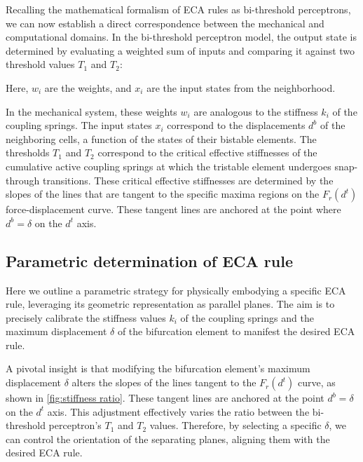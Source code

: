 Recalling the mathematical formalism of ECA rules as bi-threshold perceptrons, we can now establish a direct correspondence between the mechanical and computational domains. In the bi-threshold perceptron model, the output state is determined by evaluating a weighted sum of inputs and comparing it against two threshold values \( T_1 \) and \( T_2 \):


Here, \( w_i \) are the weights, and \( x_i \) are the input states from the neighborhood.

In the mechanical system, these weights \( w_i \) are analogous to the stiffness \( k_i \) of the coupling springs. The input states \( x_i \) correspond to the displacements \( d^b \) of the neighboring cells, a function of the states of their bistable elements. 
The thresholds \( T_1 \) and \( T_2 \) correspond to the critical effective stiffnesses of the cumulative active coupling springs at which the tristable element undergoes snap-through transitions. These critical effective stiffnesses are determined by the slopes of the lines that are tangent to the specific maxima regions on the \( F_r(d^t) \) force-displacement curve. These tangent lines are anchored at the point where \( d^b = \delta \) on the \( d^t \) axis.

\subsection*{Parametric determination of ECA rule}
Here we outline a parametric strategy for physically embodying a specific ECA rule, leveraging its geometric representation as parallel planes. The aim is to precisely calibrate the stiffness values \( k_i \) of the coupling springs and the maximum displacement \( \delta \) of the bifurcation element to manifest the desired ECA rule.

A pivotal insight is that modifying the bifurcation element's maximum displacement \( \delta \) alters the slopes of the lines tangent to the \( F_r(d^t) \) curve, as shown in \autoref*{fig:stiffness ratio}. These tangent lines are anchored at the point \( d^b = \delta \) on the \( d^t \) axis. This adjustment effectively varies the ratio between the bi-threshold perceptron's \( T_1 \) and \( T_2 \) values. Therefore, by selecting a specific \( \delta \), we can control the orientation of the separating planes, aligning them with the desired ECA rule.

